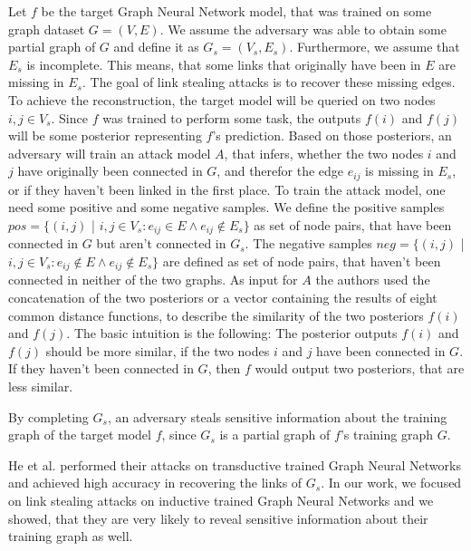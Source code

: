     Let $f$ be the target Graph Neural Network model, that was trained on some graph dataset $G = (V, E)$.
    We assume the adversary was able to obtain some partial graph of $G$ and define it as $G_s = (V_s, E_s)$.
    Furthermore, we assume that $E_s$ is incomplete.
    This means, that some links that originally have been in $E$ are missing in $E_s$.
    The goal of link stealing attacks is to recover these missing edges.
    To achieve the reconstruction, the target model will be queried on two nodes $i,j \in V_s$.
    Since $f$ was trained to perform some task, the outputs $f(i)$ and $f(j)$ will be some posterior representing $f$'s prediction.
    Based on those posteriors, an adversary will train an attack model $A$, that infers, whether the two nodes $i$ and $j$ have originally been connected in $G$, and therefor the edge $e_{ij}$ is missing in $E_s$, or if they haven't been linked in the first place.
    To train the attack model, one need some positive and some negative samples.
    We define the positive samples $pos = \{ (i,j)$ | $i,j \in V_s: e_{ij} \in E \wedge e_{ij} \not\in E_s\}$ as set of node pairs, that have been connected in $G$ but aren't connected in $G_s$. 
    The negative samples $neg = \{ (i,j)$ | $i,j \in V_s: e_{ij} \not\in E \wedge e_{ij} \not\in E_s\}$ are defined as set of node pairs, that haven't been connected in neither of the two graphs.
    As input for $A$ the authors used the concatenation of the two posteriors or a vector containing the results of eight common distance functions, to describe the similarity of the two posteriors $f(i)$ and $f(j)$.
    The basic intuition is the following: 
    The posterior outputs $f(i)$ and $f(j)$ should be more similar, if the two nodes $i$ and $j$ have been connected in $G$.
    If they haven't been connected in $G$, then $f$ would output two posteriors, that are less similar.

    By completing $G_s$, an adversary steals sensitive information about the training graph of the target model $f$, since $G_s$ is a partial graph of $f$'s training graph $G$.

    He et al. performed their attacks on transductive trained Graph Neural Networks and achieved high accuracy in recovering the links of $G_s$. 
    In our work, we focused on link stealing attacks on inductive trained Graph Neural Networks and we showed, that they are very likely to reveal sensitive information about their training graph as well.